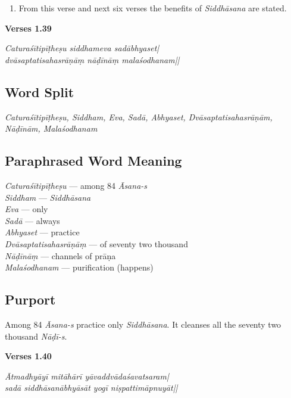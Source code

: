 \begin{enumerate}
\item From this verse and next six verses the benefits of \textit{Siddhāsana} are stated.
\end{enumerate}

\noindent \textbf{Verses 1.39}

\begin{shloka}
\textit{Caturaśītipīṭheṣu siddhameva sadābhyaset|\\
dvāsaptatisahasrāṇāṃ nāḍīnāṃ malaśodhanam||}
\end{shloka}

\subsection*{Word Split}
\vspace{-5pt}
\textit{Caturaśītipīṭheṣu, Siddham,  Eva, Sadā, Abhyaset, Dvāsaptatisahasrāṇām, Nāḍīnām, Malaśodhanam}

\subsection*{Paraphrased Word Meaning}
\vspace{-5pt}

\begin{multicols}{2}
\itemsep=0pt
\textit{Caturaśītipīṭheṣu} ---  among 84 \textit{Āsana-s} \\
\textit{Siddham} --- \textit{Siddhāsana} \\
\textit{Eva} ---  only \\
\textit{Sadā} --- always \\ 		
\textit{Abhyaset} ---  practice	 \\
\textit{Dvāsaptatisahasrāṇāṃ} ---  of seventy two thousand \\
\textit{Nāḍīnāṃ} --- channels of prāṇa \\
\textit{Malaśodhanam} ---  purification (happens)
\end{multicols}

\subsection*{Purport}

Among 84 \textit{Āsana-s} practice only \textit{Siddhāsana}. It cleanses all the seventy two thousand \textit{Nāḍī-s}. 

\noindent \textbf{Verses 1.40}

\begin{shloka}
\textit{Ātmadhyāyī mitāhārī yāvaddvādaśavatsaram|\\
sadā siddhāsanābhyāsāt yogī niṣpattimāpnuyāt||}
\end{shloka}

